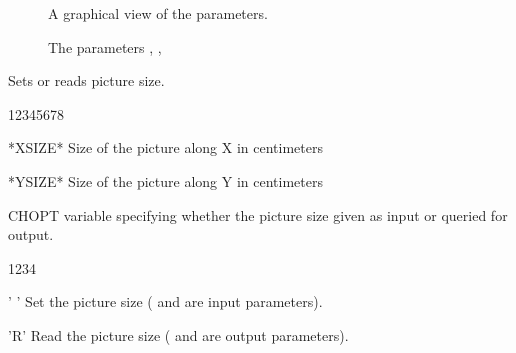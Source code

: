 \begin{figure}[p]
\begin{center}\mbox{}\end{center}
\caption{A graphical view of the \protect{} parameters.}
\label{fig:HPLSET}
\end{figure}

\begin{figure}[p]
\begin{center}\mbox{}\end{center}
\caption[The {\tt HPLSET} parameters {\tt PTYP}, {\tt BTYP} and {\tt HTYP}]%
        {The  parameters , , }
\label{TYPE}
\end{figure}
\clearpage


\Action
Sets or reads picture size.
\Pdesc
\begin{DLtt}{12345678}
\item[*XSIZE*] Size of the picture along X in centimeters
\item[*YSIZE*] Size of the picture along Y in centimeters
\item[CHOPT]   \CHARACTER{} variable specifying whether the picture size given 
               as input or queried for output.
\begin{DLtt}{1234}
\item[' '] Set the picture size ( and  are input 
           parameters).
\item['R'] Read the picture size ( and  are output 
           parameters).
\end{DLtt}
\end{DLtt}


